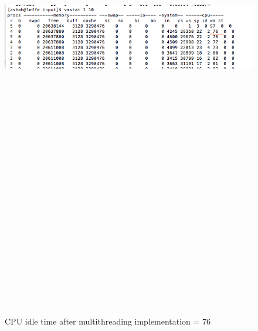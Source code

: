 \bigskip

\begin{figure}[htb]
\centering
\includegraphics[width=16cm,height=25cm,keepaspectratio]{image/cpu-wa-2.png}
\caption[CPU idle time after multithreading implementation]{CPU idle time after multithreading implementation = 76} 
\label{fig:cpu-wa-2}
\end{figure}

